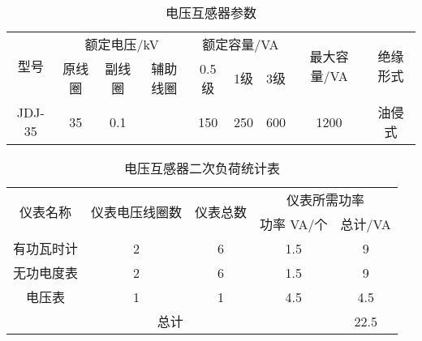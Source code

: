 \begin{table}[h]
	\centering
	\renewcommand\arraystretch{2}
	\caption{电压互感器参数}
	\label{tab:电压互感器参数}
	\begin{tabular}{|c|ccc|ccc|c|c|}
		\hline
		\multirow{2}{*}{型号} & \multicolumn{3}{c|}{额定电压/kV}                               & \multicolumn{3}{c|}{额定容量/VA}                               & \multirow{2}{*}{最大容量/VA} & \multirow{2}{*}{绝缘形式} \\ \cline{2-7}
		& \multicolumn{1}{c|}{原线圈} & \multicolumn{1}{c|}{副线圈} & 辅助线圈 & \multicolumn{1}{c|}{0.5级} & \multicolumn{1}{c|}{1级}  & 3级  &                          &                       \\ \hline
		JDJ-35              & \multicolumn{1}{c|}{35}  & \multicolumn{1}{c|}{0.1} &      & \multicolumn{1}{c|}{150}  & \multicolumn{1}{c|}{250} & 600 & 1200                     & 油侵式                   \\ \hline
	\end{tabular}
\end{table}


\begin{table}[h]
	\caption{电压互感器二次负荷统计表}
	\centering
	\renewcommand\arraystretch{2}
	\label{tab:电压互感器二次负荷统计表}
	\begin{tabular}{|ccccc|}
		\hline
		\multicolumn{1}{|c|}{\multirow{2}{*}{仪表名称}} & \multicolumn{1}{c|}{\multirow{2}{*}{仪表电压线圈数}} & \multicolumn{1}{c|}{\multirow{2}{*}{仪表总数}} & \multicolumn{2}{c|}{仪表所需功率}          \\ \cline{4-5} 
		\multicolumn{1}{|c|}{}                      & \multicolumn{1}{c|}{}                         & \multicolumn{1}{c|}{}                      & \multicolumn{1}{c|}{功率 VA/个} & 总计/VA \\ \hline
		\multicolumn{1}{|c|}{有功瓦时计}                 & \multicolumn{1}{c|}{2}                        & \multicolumn{1}{c|}{6}                     & \multicolumn{1}{c|}{1.5}     & 9     \\ \hline
		\multicolumn{1}{|c|}{无功电度表}                 & \multicolumn{1}{c|}{2}                        & \multicolumn{1}{c|}{6}                     & \multicolumn{1}{c|}{1.5}     & 9     \\ \hline
		\multicolumn{1}{|c|}{电压表}                   & \multicolumn{1}{c|}{1}                        & \multicolumn{1}{c|}{1}                     & \multicolumn{1}{c|}{4.5}     & 4.5   \\ \hline
		\multicolumn{4}{|c|}{总计}                                                                                                                                                & 22.5  \\ \hline
	\end{tabular}
\end{table}

